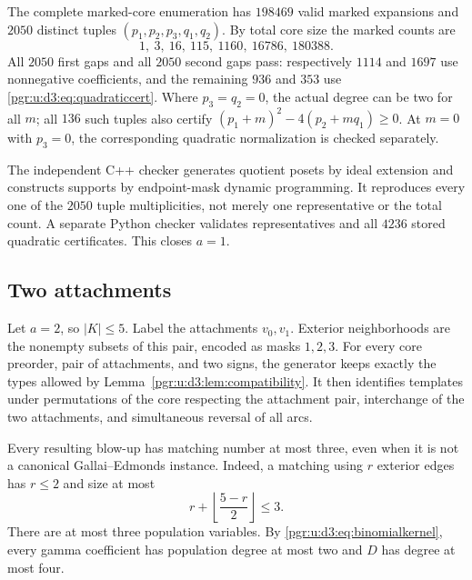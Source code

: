 \documentclass[11pt]{article}
\numberwithin{equation}{section}
\theoremstyle{definition}\newtheorem{definition}[theorem]{Definition}\newtheorem{remark}[theorem]{Remark}
\begin{document}
The complete marked-core enumeration has $198469$ valid marked expansions and $2050$ distinct tuples $(p_1,p_2,p_3,q_1,q_2)$. By total core size the marked counts are
\[
 1,\ 3,\ 16,\ 115,\ 1160,\ 16786,\ 180388.
\]
All $2050$ first gaps and all $2050$ second gaps pass: respectively $1114$ and $1697$ use nonnegative coefficients, and the remaining $936$ and $353$ use \eqref{pgr:u:d3:eq:quadraticcert}. Where $p_3=q_2=0$, the actual degree can be two for all $m$; all $136$ such tuples also certify $(p_1+m)^2-4(p_2+mq_1)\ge0$. At $m=0$ with $p_3=0$, the corresponding quadratic normalization is checked separately.

The independent C++ checker generates quotient posets by ideal extension and constructs supports by endpoint-mask dynamic programming. It reproduces every one of the $2050$ tuple multiplicities, not merely one representative or the total count. A separate Python checker validates representatives and all $4236$ stored quadratic certificates. This closes $a=1$.

\subsection{Two attachments}

Let $a=2$, so $|K|\le5$. Label the attachments $v_0,v_1$. Exterior neighborhoods are the nonempty subsets of this pair, encoded as masks $1,2,3$. For every core preorder, pair of attachments, and two signs, the generator keeps exactly the types allowed by Lemma~\ref{pgr:u:d3:lem:compatibility}. It then identifies templates under permutations of the core respecting the attachment pair, interchange of the two attachments, and simultaneous reversal of all arcs.

Every resulting blow-up has matching number at most three, even when it is not a canonical Gallai--Edmonds instance. Indeed, a matching using $r$ exterior edges has $r\le2$ and size at most
\[
 r+\left\lfloor\frac{5-r}{2}\right\rfloor\le3.
\]
There are at most three population variables. By \eqref{pgr:u:d3:eq:binomialkernel}, every gamma coefficient has population degree at most two and $D$ has degree at most four.
\end{document}
